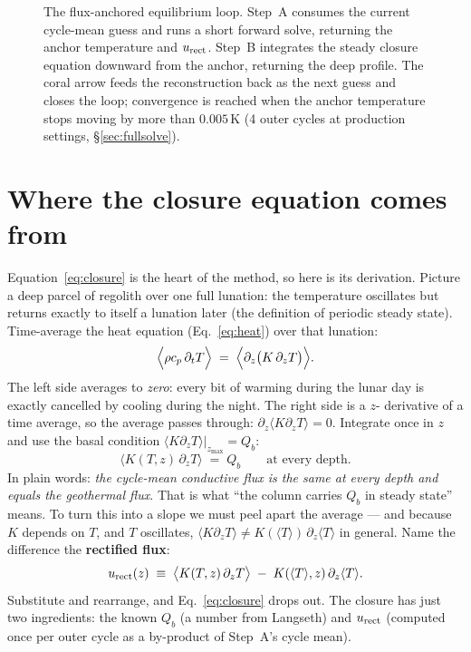 \documentclass[11pt]{report}
\newcommand{\Tm}{\langle T\rangle}
\begin{document}
\begin{figure}[htbp]\centering

\caption{The flux-anchored equilibrium loop. Step~A consumes the current
cycle-mean guess and runs a short forward solve, returning the anchor
temperature and $u_{\rm rect}$. Step~B integrates the steady closure equation
downward from the anchor, returning the deep profile. The coral arrow feeds the
reconstruction back as the next guess and closes the loop; convergence is reached
when the anchor temperature stops moving by more than $0.005$\,K (4 outer
cycles at production settings, \S\ref{sec:fullsolve}).}
\label{fig:fluxanchored}
\end{figure}

\section{Where the closure equation comes from}\label{sec:closure}

Equation~\eqref{eq:closure} is the heart of the method, so here is its
derivation. Picture a deep parcel of regolith over one full lunation: the
temperature oscillates but returns exactly to itself a lunation later (the
definition of periodic steady state). Time-average the heat equation
(Eq.~\eqref{eq:heat}) over that lunation:
\[
\Bigl\langle \rho c_p\,\partial_t T\Bigr\rangle
\;=\;
\Bigl\langle \partial_z\bigl(K\,\partial_z T\bigr)\Bigr\rangle.
\]
The left side averages to \emph{zero}: every bit of warming during the lunar day
is exactly cancelled by cooling during the night. The right side is a $z$-
derivative of a time average, so the average passes through: $\partial_z\langle
K\partial_z T\rangle=0$. Integrate once in $z$ and use the basal condition
$\langle K\partial_z T\rangle|_{z_{\max}}=Q_b$:
\begin{equation}
\bigl\langle K(T,z)\,\partial_z T\bigr\rangle \;=\; Q_b
\qquad\text{at every depth.}
\label{eq:fluxsame}
\end{equation}
In plain words: \emph{the cycle-mean conductive flux is the same at every depth
and equals the geothermal flux}. That is what ``the column carries $Q_b$ in
steady state'' means. To turn this into a slope we must peel apart the average ---
and because $K$ depends on $T$, and $T$ oscillates, $\langle K\partial_z
T\rangle \ne K(\Tm)\,\partial_z\Tm$ in general. Name the difference the
\textbf{rectified flux}:
\[
u_{\rm rect}(z) \;\equiv\;
\bigl\langle K(T,z)\,\partial_z T\bigr\rangle \;-\; K(\Tm,z)\,\partial_z\Tm.
\]
Substitute and rearrange, and Eq.~\eqref{eq:closure} drops out. The closure has
just two ingredients: the known $Q_b$ (a number from Langseth) and $u_{\rm rect}$
(computed once per outer cycle as a by-product of Step~A's cycle mean).
\end{document}
